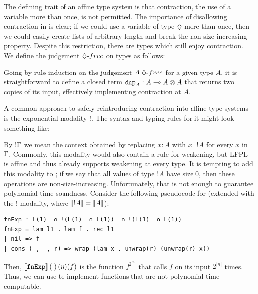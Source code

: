 The defining trait of an affine type system is that contraction, the use of a variable more than once, is not permitted. The importance of disallowing contraction in \lfpl is clear; if we could use a variable of type $\tpdiam$ more than once, then we could easily create lists of arbitrary length and break the non-size-increasing property. Despite this restriction, there are types which still enjoy contraction. We define the judgement $\hspace{-0.25em}\dfree{}$ on types as follows:
Going by rule induction on the judgement $\dfree{A}$ for a given type $A$, it is straightforward to define a closed term $\code{dup}_A : \tparr{A}{\tptens{A}{A}}$ that returns two copies of its input, effectively implementing contraction at $A$.

A common approach to safely reintroducing contraction into affine type systems is the exponential modality $!$. The syntax and typing rules for it might look something like:

By $!\Gamma$ we mean the context obtained by replacing $x : A$ with $x : \; !A$ for every $x$ in $\Gamma$. Commonly, this modality would also contain a rule for weakening, but LFPL is affine and thus already supports weakening at every type. It is tempting to add this modality to \lfpl; if we say that all values of type $!A$ have size $0$, then these operations are non-size-increasing. Unfortunately, that is not enough to guarantee polynomial-time soundness. Consider the following pseudocode for \lfpl (extended with the !-modality, where $\llbracket !A \rrbracket = \llbracket A \rrbracket$):
\begin{lstlisting}
fnExp : L(1) -o !(L(1) -o L(1)) -o !(L(1) -o L(1))
fnExp = lam l1 . lam f . rec l1
| nil => f
| cons (_, _, r) => wrap (lam x . unwrap(r) (unwrap(r) x))
\end{lstlisting}
Then, ${\llbracket \mathtt{fnExp} \rrbracket}\left(\cdot\right)(n)(f)$ is the function $f^{2^{|n|}}$ that calls $f$ on its input $2^{|n|}$ times. Thus, we can use  to implement functions that are not polynomial-time computable.
